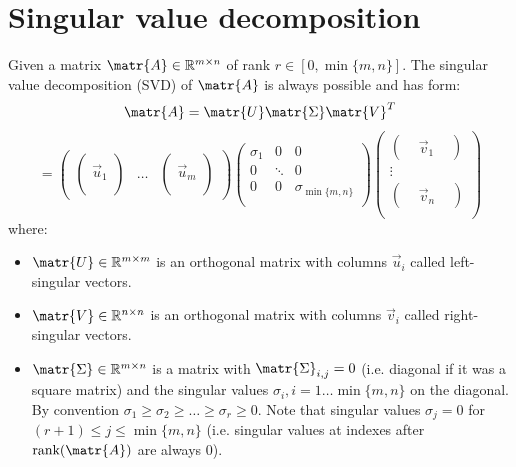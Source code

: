 \section{Singular value decomposition}
Given a matrix $\matr{A} \in \mathbb{R}^{m \times n}$ of rank $r \in [0, \min\{m, n\}]$.
The singular value decomposition (SVD) of $\matr{A}$ is always possible and has form:
\[
    \matr{A} = \matr{U}\matr{\Sigma}\matr{V}^T
\]
\[
    =
    \begin{pmatrix}
        \begin{pmatrix} \\ \vec{u}_1 \\ \\ \end{pmatrix}    &
        \dots                                               &
        \begin{pmatrix} \\ \vec{u}_m \\ \\ \end{pmatrix} 
    \end{pmatrix}
    \begin{pmatrix}
        \sigma_1    & 0         & 0                 \\
        0           & \ddots    & 0                 \\
        0           & 0    & \sigma_{\min\{m, n\}}  \\
    \end{pmatrix}
    \begin{pmatrix}
        \begin{pmatrix} & \vec{v}_1 & \end{pmatrix} \\
        \vdots                                      \\
        \begin{pmatrix} & \vec{v}_n & \end{pmatrix} \\
    \end{pmatrix}
\]
where:
\begin{itemize}
    \item 
        $\matr{U} \in \mathbb{R}^{m \times m}$ is an orthogonal matrix with columns $\vec{u}_i$ called left-singular vectors.
    
    \item 
        $\matr{V} \in \mathbb{R}^{n \times n}$ is an orthogonal matrix with columns $\vec{v}_i$ called right-singular vectors.
    
    \item 
        $\matr{\Sigma} \in \mathbb{R}^{m \times n}$ is a matrix with $\matr{\Sigma}_{i,j} = 0$ (i.e. diagonal if it was a square matrix) and
        the singular values $\sigma_i, i = 1 \dots \min\{m, n\}$ on the diagonal.
        By convention $\sigma_1 \geq \sigma_2 \geq \dots \geq \sigma_r \geq 0$.
        Note that singular values $\sigma_j = 0$ for $(r + 1) \leq j \leq \min\{m, n\}$ 
        (i.e. singular values at indexes after $\text{rank}(\matr{A})$ are always 0).
\end{itemize}

